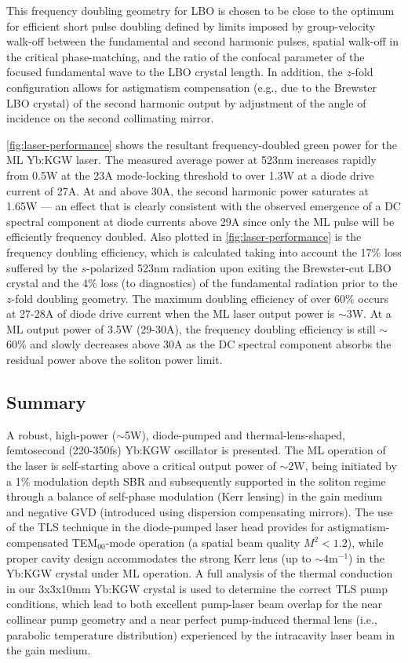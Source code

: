 This frequency doubling geometry for LBO is chosen to be close to the optimum for efficient short pulse doubling \cite{wang_efficiency_2003,Saltiel_second_harmonic_2004} defined by limits imposed by group-velocity walk-off between the fundamental and second harmonic pulses, spatial walk-off in the critical phase-matching, and the ratio of the confocal parameter of the focused fundamental wave to the LBO crystal length.
In addition, the $z$-fold configuration allows for astigmatism compensation (e.g., due to the Brewster LBO crystal) of the second harmonic output by adjustment of the angle of incidence on the second collimating mirror.

\ref{fig:laser-performance} shows the resultant frequency-doubled green power for the ML Yb:KGW laser.
The measured average power at 523nm increases rapidly from 0.5W at the 23A mode-locking threshold to over 1.3W at a diode drive current of 27A.
At and above 30A, the second harmonic power saturates at 1.65W --- an effect that is clearly consistent with the observed emergence of a DC spectral component at diode currents above 29A since only the ML pulse will be efficiently frequency doubled.
Also plotted in \ref{fig:laser-performance} is the frequency doubling efficiency, which is calculated taking into account the 17\% loss suffered by the $s$-polarized 523nm radiation upon exiting the Brewster-cut LBO crystal and the 4\% loss (to diagnostics) of the fundamental radiation prior to the $z$-fold doubling geometry.
The maximum doubling efficiency of over 60\% occurs at 27-28A of diode drive current when the ML laser output power is $\sim$3W.
At a ML output power of 3.5W (29-30A), the frequency doubling efficiency is still $\sim$60\% and slowly decreases above 30A as the DC spectral component absorbs the residual power above the soliton power limit.

\subsection{Summary}


A robust, high-power ($\sim$5W), diode-pumped and thermal-lens-shaped, femtosecond (220-350fs) Yb:KGW oscillator is presented.
The ML operation of the laser is self-starting above a critical output power of $\sim$2W, being initiated by a 1\% modulation depth SBR and subsequently supported in the soliton regime through a balance of self-phase modulation (Kerr lensing) in the gain medium and negative GVD (introduced using dispersion compensating mirrors).
The use of the TLS technique in the diode-pumped laser head provides for astigmatism-compensated TEM$_{00}$-mode operation (a spatial beam quality $M^2 <1.2$), while proper cavity design accommodates the strong Kerr lens (up to $\sim4\text{m}^{-1}$) in the Yb:KGW crystal under ML operation.
A full analysis of the thermal conduction in our 3x3x10mm Yb:KGW crystal is used to determine the correct TLS pump conditions, which lead to both excellent pump-laser beam overlap for the near collinear pump geometry and a near perfect pump-induced thermal lens (i.e., parabolic temperature distribution) experienced by the intracavity laser beam in the gain medium.

